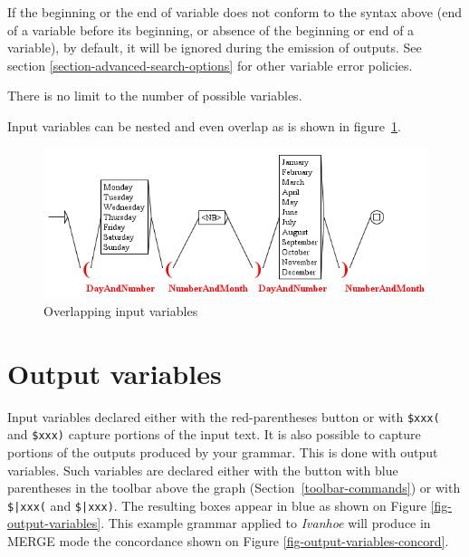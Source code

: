 \bigskip
\noindent If the beginning or the end of variable does not conform to the syntax above (end of a variable before
its beginning, or absence of the beginning or end of a variable), by default, it
will be ignored during the emission of outputs. See section
\ref{section-advanced-search-options} for other variable error policies.

\bigskip
\noindent There is no limit to the number of possible variables.

\bigskip
\noindent Input variables can be nested and even overlap as is shown in
figure~\ref{fig-overlapping-variables}.

\begin{figure}[!ht]
\begin{center}
\includegraphics[width=15cm]{resources/img/fig6-29.png}
\caption{Overlapping input variables\label{fig-overlapping-variables}}
\end{center}
\end{figure}

\clearpage




\section{Output variables}
\label{section-output-variables}
Input variables declared either with the red-parentheses button 
or with \verb+$xxx(+ and \verb+$xxx)+ capture portions of the input text. It
is also possible to capture portions of the outputs produced by your grammar. This is done with output variables.
Such variables are declared either with the button with blue parentheses in the toolbar above the graph
(Section~\ref{toolbar-commands}) or with \verb+$|xxx(+ and \verb+$|xxx)+.
The resulting boxes appear in blue as shown on Figure \ref{fig-output-variables}.
This example grammar applied to \textit{Ivanhoe} will produce in MERGE mode the concordance 
shown on Figure \ref{fig-output-variables-concord}.

